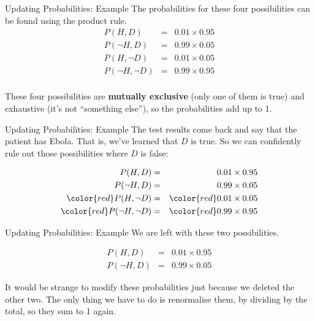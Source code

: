 \documentclass{beamer}
\begin{document}
\begin{frame}[t]{Updating Probabilities: Example}
The probabilities for these four possibilities can be found using the product
rule.
\begin{eqnarray*}
P(H, D) &=& 0.01 \times 0.95\\
P(\neg H, D) &=& 0.99 \times 0.05\\
P(H, \neg D) &=& 0.01 \times 0.05\\
P(\neg H, \neg D) &=& 0.99 \times 0.95\\
\end{eqnarray*}
\vspace{-45pt}

These four possibilities are {\bf mutually exclusive} (only one of them is true)
and exhaustive (it's not ``something else''), so the probabilities add up to 1.

\end{frame}

\begin{frame}[t]{Updating Probabilities: Example}
The test results come back and say that the patient has Ebola. That is, we've
learned that $D$ is true. So we can confidently rule out those possibilities
where $D$ is false:

\begin{eqnarray*}
P(H, D) &=& 0.01 \times 0.95\\
P(\neg H, D) &=& 0.99 \times 0.05\\
{\color{red} P(H, \neg D)} &=& {\color{red} 0.01 \times 0.05}\\
{\color{red} P(\neg H, \neg D)} &=& {\color{red} 0.99 \times 0.95}\\
\end{eqnarray*}


\end{frame}


\begin{frame}[t]{Updating Probabilities: Example}
We are left with these two possibilities.

\begin{eqnarray*}
P(H, D) &=& 0.01 \times 0.95\\
P(\neg H, D) &=& 0.99 \times 0.05
\end{eqnarray*}

It would be strange to modify these probabilities just because we deleted the
other two. The only thing we have to do is renormalise them, by dividing by the total, so they sum to 1 again.
\end{frame}
\end{document}
